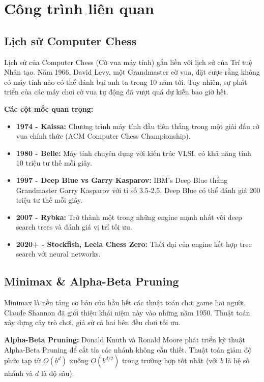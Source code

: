 \section{Công trình liên quan}

\subsection{Lịch sử Computer Chess}
Lịch sử của Computer Chess (Cờ vua máy tính) gắn liền với lịch sử của Trí tuệ Nhân tạo. Năm 1966, David Levy, một Grandmaster cờ vua, đặt cược rằng không có máy tính nào có thể đánh bại anh ta trong 10 năm tới. Tuy nhiên, sự phát triển của các máy chơi cờ vua tự động đã vượt quá dự kiến bao giờ hết.

\textbf{Các cột mốc quan trọng:}
\begin{itemize}
    \item \textbf{1974 - Kaissa:} Chương trình máy tính đầu tiên thắng trong một giải đấu cờ vua chính thức (ACM Computer Chess Championship).
    \item \textbf{1980 - Belle:} Máy tính chuyên dụng với kiến trúc VLSI, có khả năng tính 10 triệu tư thế mỗi giây.
    \item \textbf{1997 - Deep Blue vs Garry Kasparov:} IBM's Deep Blue thắng Grandmaster Garry Kasparov với tỉ số 3.5-2.5. Deep Blue có thể đánh giá 200 triệu tư thế mỗi giây.
    \item \textbf{2007 - Rybka:} Trở thành một trong những engine mạnh nhất với deep search trees và đánh giá vị trí tối ưu.
    \item \textbf{2020+ - Stockfish, Leela Chess Zero:} Thời đại của engine kết hợp tree search với neural networks.
\end{itemize}

\subsection{Minimax \& Alpha-Beta Pruning}
Minimax là nền tảng cơ bản của hầu hết các thuật toán chơi game hai người. Claude Shannon đã giới thiệu khái niệm này vào những năm 1950. Thuật toán xây dựng cây trò chơi, giả sử cả hai bên đều chơi tối ưu.

\textbf{Alpha-Beta Pruning:} Donald Knuth và Ronald Moore phát triển kỹ thuật Alpha-Beta Pruning để cắt tỉa các nhánh không cần thiết. Thuật toán giảm độ phức tạp từ $O(b^d)$ xuống $O(b^{d/2})$ trong trường hợp tốt nhất (với $b$ là hệ số nhánh và $d$ là độ sâu).

